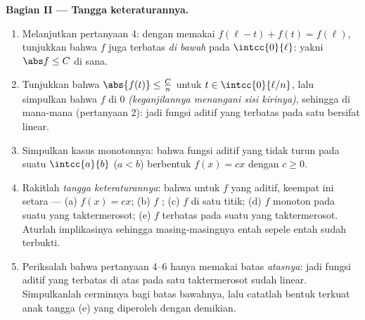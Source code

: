 \begin{problem}[{Soal akhir pekan --- $f(x + y) = f(x) + f(y)$:
keteraturan memaksa kelinearan, beserta potret monsternya}]
\medskip
\noindent\textbf{Bagian II --- Tangga keteraturannya.}
\begin{enumerate}[resume]
  \item Melanjutkan pertanyaan 4: dengan memakai $f(\ell - t) + f(t) =
        f(\ell)$, tunjukkan bahwa $f$ juga terbatas \emph{di bawah} pada
        $\intcc{0}{\ell}$: yakni $\abs f \leq C$ di sana.
  \item Tunjukkan bahwa $\abs{f(t)} \leq \frac{C}{n}$ untuk $t \in
        \intcc{0}{\ell/n}$, lalu simpulkan bahwa $f$  di
        $0$ \emph{(keganjilannya menangani sisi kirinya)}, sehingga
        di mana-mana (pertanyaan 2): jadi fungsi aditif yang terbatas pada
        satu  bersifat linear.
  \item Simpulkan kasus monotonnya: bahwa fungsi aditif yang
        tidak turun pada suatu $\intcc{a}{b}$ ($a < b$) berbentuk $f(x)
        = cx$ dengan $c \geq 0$.
  \item Rakitlah \emph{tangga keteraturannya}: bahwa untuk $f$ yang
        aditif, keempat ini setara --- (a) $f(x) = cx$;
        (b) $f$ ; (c) $f$  di satu titik; (d)
        $f$ monoton pada suatu  yang taktermerosot; (e) $f$
        terbatas pada suatu  yang taktermerosot. Aturlah
        implikasinya sehingga masing-masingnya entah sepele entah sudah
        terbukti.
  \item Periksalah bahwa pertanyaan 4--6 hanya memakai batas
        \emph{atasnya}: jadi fungsi aditif yang terbatas di atas pada satu
         taktermerosot sudah linear. Simpulkanlah
         cerminnya bagi batas bawahnya, lalu catatlah
        bentuk terkuat anak tangga (e) yang diperoleh dengan demikian.
\end{enumerate}


\end{problem}
